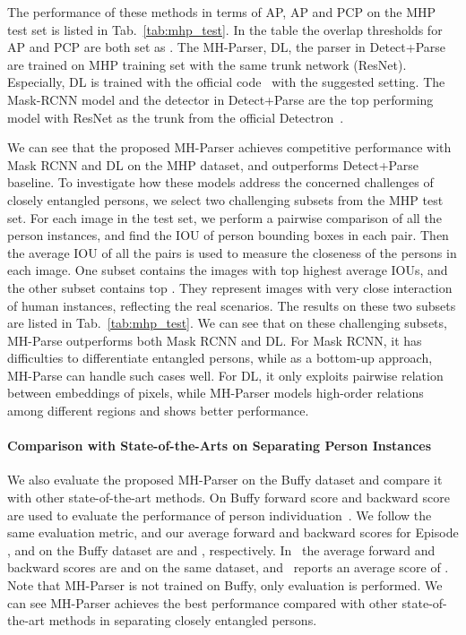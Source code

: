 \documentclass[10pt, letterpaper]{article}
\begin{document}
The performance of these methods in terms of AP, AP and PCP on the MHP test set is listed in Tab.~\ref{tab:mhp_test}.  In the table the overlap thresholds for AP and PCP are both set as . The MH-Parser, DL, the parser in Detect+Parse are trained on MHP training set with the same trunk network (ResNet). Especially, DL is trained with the official code~\cite{de2017semantic,neven2017fast} with the suggested setting. The Mask-RCNN model and the detector in Detect+Parse are the top performing model with ResNet as the trunk from the official Detectron~\cite{Detectron2018}. 

We can see that the proposed MH-Parser achieves competitive performance with Mask RCNN and DL on  the MHP dataset, and outperforms Detect+Parse baseline.  To investigate how these models address the concerned challenges of closely entangled persons, we select two challenging subsets from the MHP test set. For each image in the test set, we perform a pairwise comparison of all the person instances, and find the IOU of person bounding boxes in each pair. Then the average IOU of all the pairs is used to measure the closeness of the persons in each image. One subset contains the images with top  highest average IOUs, and the other subset contains top . They represent images with very close interaction of human instances, reflecting the real scenarios. The results on these two subsets are listed in Tab.~\ref{tab:mhp_test}. We can see that on these challenging subsets, MH-Parse outperforms both Mask RCNN and DL. For Mask RCNN, it has difficulties to differentiate entangled persons, while as a bottom-up approach, MH-Parse can handle such cases well. For DL, it only exploits pairwise relation between embeddings of pixels, while MH-Parser models high-order relations among different regions and shows better performance. 

\paragraph{Comparison with State-of-the-Arts on Separating Person Instances}
We also evaluate the proposed MH-Parser on the Buffy dataset and compare it with other state-of-the-art methods. On Buffy forward score and backward score are used to evaluate the performance of person individuation~\cite{jiang2017detangling}. We follow the same evaluation metric, and our average forward and backward scores for Episode ,  and  on the Buffy dataset are  and , respectively. In~\cite{jiang2017detangling} the average forward and backward scores are  and  on the same dataset, and~\cite{vineet2011human} reports an average score of . Note that MH-Parser is not trained on Buffy, only evaluation is performed. We can see MH-Parser achieves the best performance compared with other state-of-the-art methods in separating closely entangled persons.
\end{document}
